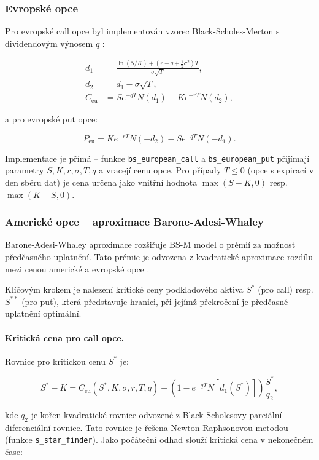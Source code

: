 \subsubsection{Evropské opce}

Pro evropské call opce byl implementován vzorec Black-Scholes-Merton s dividendovým výnosem \(q\) \citep[s.~15.1]{McDonald2013}:

\[
\begin{aligned}
d_1 &= \frac{\ln(S/K) + (r - q + \frac{1}{2}\sigma^2)T}{\sigma\sqrt{T}}, \\[2pt]
d_2 &= d_1 - \sigma\sqrt{T}, \\[2pt]
C_{\text{eu}} &= S e^{-qT} N(d_1) - K e^{-rT} N(d_2),
\end{aligned}
\]

a pro evropské put opce:

\[
P_{\text{eu}} = K e^{-rT} N(-d_2) - S e^{-qT} N(-d_1).
\]

Implementace je přímá – funkce \texttt{bs\_european\_call} a \texttt{bs\_european\_put} přijímají parametry \(S, K, r, \sigma, T, q\) a vracejí cenu opce. Pro případy \(T \le 0\) (opce s expirací v den sběru dat) je cena určena jako vnitřní hodnota \(\max(S - K, 0)\) resp. \(\max(K - S, 0)\).

\subsubsection{Americké opce – aproximace Barone-Adesi-Whaley}

Barone-Adesi-Whaley aproximace rozšiřuje BS-M model o prémií za možnost předčasného uplatnění. Tato prémie je odvozena z kvadratické aproximace rozdílu mezi cenou americké a evropské opce \citep[Kapitola~3.1]{Haug2007}.

Klíčovým krokem je nalezení kritické ceny podkladového aktiva \(S^*\) (pro call) resp. \(S^{**}\) (pro put), která představuje hranici, při jejímž překročení je předčasné uplatnění optimální.

\paragraph{Kritická cena pro call opce.} Rovnice pro kritickou cenu \(S^*\) je:

\[
S^* - K = C_{\text{eu}}(S^*, K, \sigma, r, T, q) + \left(1 - e^{-qT} N[d_1(S^*)]\right) \frac{S^*}{q_2},
\]

kde \(q_2\) je kořen kvadratické rovnice odvozené z Black-Scholesovy parciální diferenciální rovnice. Tato rovnice je řešena Newton-Raphsonovou metodou (funkce \texttt{s\_star\_finder}). Jako počáteční odhad slouží kritická cena v nekonečném čase:


